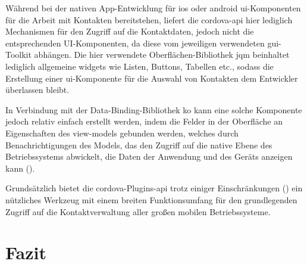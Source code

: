 Während bei der nativen App-Entwicklung für \gls{ios} oder \gls{android} \gls{ui}-Komponenten für die Arbeit mit Kontakten bereitstehen, liefert die \gls{cordova}-\gls{api} hier lediglich Mechanismen für den Zugriff auf die Kontaktdaten, jedoch nicht die entsprechenden UI-Komponenten, da diese vom jeweiligen verwendeten \gls{gui}-Toolkit abhängen.
Die hier verwendete Oberflächen-Bibliothek \gls{jqm} beinhaltet lediglich allgemeine \glspl{widget} wie Listen, Buttons, Tabellen etc., sodass die Erstellung einer \gls{ui}-Komponente für die Auswahl von Kontakten dem Entwickler überlassen bleibt.

In Verbindung mit der Data-Binding-Bibliothek \gls{ko} kann eine solche Komponente jedoch relativ einfach erstellt werden, indem die Felder in der Oberfläche an Eigenschaften des \glspl{view-model} gebunden werden, welches durch Benachrichtigungen des Models, das den Zugriff auf die native Ebene des Betriebssystems abwickelt, die Daten der Anwendung und des Geräts anzeigen kann ().

Grundsätzlich bietet die \gls{cordova}-Plugins-\gls{api} trotz einiger Einschränkungen (\so) ein nützliches Werkzeug mit einem breiten Funktionsumfang für den grundlegenden Zugriff auf die Kontaktverwaltung aller großen mobilen Betriebssysteme.



	\section{Fazit} %
